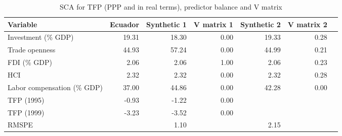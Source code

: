 \begin{table}[!htbp]
\begin{center}
\caption{SCA for TFP (PPP and in real terms), predictor balance and V matrix} \label{table:TFP_balance}
\begin{tabular}{l r r r r r r}     \\ \toprule
  Variable                    &    Ecuador &  Synthetic 1 & V matrix 1 & Synthetic 2 & V matrix 2 \\ \midrule 
  Investment (\% GDP)         &     19.31  &       18.30  &       0.00 &      19.33  &       0.28 \\
  Trade openness              &     44.93  &       57.24  &       0.00 &      44.99  &       0.21 \\ 
  FDI (\% GDP)                &      2.06  &        2.06  &      ~1.00 &       2.06  &       0.23 \\
  HCI                         &      2.32  &        2.32  &       0.00 &       2.32  &       0.28 \\
  Labor compensation (\% GDP) &     37.00  &       44.86  &      ~0.00 &      42.28  &       0.00 \\ \midrule
  TFP (1995)                  &     -0.93  &       -1.22  &      ~0.00 &             &            \\
  TFP (1999)                  &     -3.23  &       -3.52  &       0.00 &             &            \\ \midrule
  RMSPE                       &            &        1.10  &            &       2.15  &            \\
  \bottomrule 
\end{tabular}
\end{center}
\end{table}
